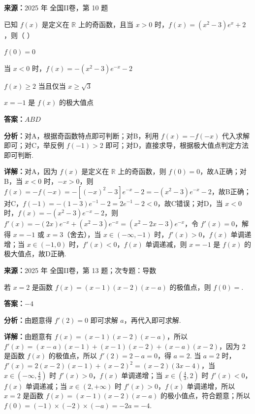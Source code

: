 \begin{question}[points=6]
\textbf{来源：}2025 年 全国II卷，第 10 题\par
已知 $f(x)$ 是定义在 $\mathbb{R}$ 上的奇函数，且当 $x>0$ 时，$f(x)=(x^2-3)e^x+2$，则（ ）
\begin{choices}
  \item $f(0)=0$
  \item 当 $x<0$ 时，$f(x)=-(x^2-3)e^{-x}-2$
  \item $f(x)\ge 2$ 当且仅当 $x\ge\sqrt{3}$
  \item $x=-1$ 是 $f(x)$ 的极大值点
\end{choices}
\begin{solution}
\textbf{答案：}$ABD$

\textbf{分析：}对A，根据奇函数特点即可判断；对B，利用 $f(x)=-f(-x)$ 代入求解即可；对C，举反例 $f(-1)>2$ 即可；对D，直接求导，根据极大值点判定方法即可判断.

\textbf{详解：}对A，因为 $f(x)$ 是定义在 $\mathbb{R}$ 上的奇函数，则 $f(0)=0$，故A正确；对B，当 $x<0$ 时，$-x>0$，则 $f(x)=-f(-x)=-[(-x)^2-3]e^{-x}-2=-(x^2-3)e^{-x}-2$，故B正确；对C，$f(-1)=-(1-3)e^{-1}-2=2e^{-1}-2<0$，故C错误；对D，当 $x<0$ 时，$f(x)=-(x^2-3)e^{-x}-2$，则 $f'(x)=-(2x)e^{-x}+(x^2-3)e^{-x}=(x^2-2x-3)e^{-x}$，令 $f'(x)=0$，解得 $x=-1$ 或 $x=3$（舍去），当 $x\in(-\infty,-1)$ 时，$f'(x)>0$，$f(x)$ 单调递增；当 $x\in(-1,0)$ 时，$f'(x)<0$，$f(x)$ 单调递减，则 $x=-1$ 是 $f(x)$ 的极大值点，故D正确.
\end{solution}
\end{question}

\begin{question}[points=5]
\textbf{来源：}2025 年 全国II卷，第 13 题；次专题：导数\par
若 $x=2$ 是函数 $f(x)=(x-1)(x-2)(x-a)$ 的极值点，则 $f(0)=$.
\fillin[{$-4$}]
\begin{solution}
\textbf{答案：}$-4$

\textbf{分析：}由题意得 $f'(2)=0$ 即可求解 $a$，再代入即可求解.

\textbf{详解：}由题意有 $f(x)=(x-1)(x-2)(x-a)$，所以 $f'(x)=(x-a)(x-1)+(x-1)(x-2)+(x-a)(x-2)$，因为 $2$ 是函数 $f(x)$ 的极值点，所以 $f'(2)=2-a=0$，得 $a=2$. 当 $a=2$ 时，$f'(x)=2(x-2)(x-1)+(x-2)^2=(x-2)(3x-4)$，当 $x\in(-\infty,\frac{4}{3})$ 时 $f'(x)>0$，$f(x)$ 单调递增；当 $x\in(\frac{4}{3},2)$ 时 $f'(x)<0$，$f(x)$ 单调递减；当 $x\in(2,+\infty)$ 时 $f'(x)>0$，$f(x)$ 单调递增，所以 $x=2$ 是函数 $f(x)=(x-1)(x-2)(x-a)$ 的极小值点，符合题意；所以 $f(0)=(-1)\times(-2)\times(-a)=-2a=-4$.
\end{solution}
\end{question}

